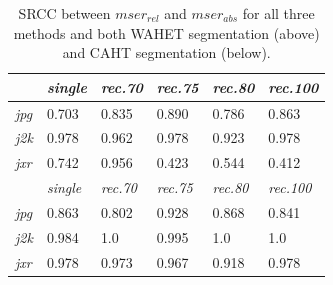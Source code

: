 \documentclass[10pt,twocolumn,letterpaper]{article}
\begin{document}
\begin{table}\footnotesize\centering
\begin{tabular}{ | l || l | l | l | l | l | }
    \hline
    & \emph{single} & \emph{rec.70} & \emph{rec.75} & \emph{rec.80} & \emph{rec.100} \\ \hline
    \emph{jpg} & 0.703 \cellcolor[rgb]{0,0.8,0} & 0.835 \cellcolor[rgb]{0,0.5,0} & 0.890 \cellcolor[rgb]{0,0.5,0} & 0.786 \cellcolor[rgb]{0,0.8,0} & 0.863 \cellcolor[rgb]{0,0.5,0} \\ \hline
    \emph{j2k} & 0.978 \cellcolor[rgb]{0,0.5,0} & 0.962 \cellcolor[rgb]{0,0.5,0} & 0.978 \cellcolor[rgb]{0,0.5,0} & 0.923 \cellcolor[rgb]{0,0.5,0} & 0.978 \cellcolor[rgb]{0,0.5,0} \\ \hline
    \emph{jxr} & 0.742 \cellcolor[rgb]{0,0.8,0} & 0.956 \cellcolor[rgb]{0,0.5,0} & 0.423 \cellcolor{orange} & 0.544 \cellcolor[rgb]{0,0.8,0} & 0.412 \cellcolor{orange} \\ \hline
    
    \hline
    & \emph{single} & \emph{rec.70} & \emph{rec.75} & \emph{rec.80} & \emph{rec.100} \\ \hline
    \emph{jpg} & \cellcolor[rgb]{0,0.5,0} 0.863 & \cellcolor[rgb]{0,0.5,0} 0.802 & \cellcolor[rgb]{0,0.5,0} 0.928 & \cellcolor[rgb]{0,0.5,0} 0.868 & \cellcolor[rgb]{0,0.5,0} 0.841 \\ \hline
    \emph{j2k} & \cellcolor[rgb]{0,0.5,0} 0.984 & \cellcolor[rgb]{0,0.5,0} 1.0 & \cellcolor[rgb]{0,0.5,0} 0.995 & \cellcolor[rgb]{0,0.5,0} 1.0 & \cellcolor[rgb]{0,0.5,0} 1.0 \\ \hline
    \emph{jxr} & \cellcolor[rgb]{0,0.5,0} 0.978 & \cellcolor[rgb]{0,0.5,0} 0.973 & \cellcolor[rgb]{0,0.5,0} 0.967 & \cellcolor[rgb]{0,0.5,0} 0.918 & \cellcolor[rgb]{0,0.5,0} 0.978 \\ \hline

\end{tabular}
\caption{SRCC between $mser_{rel}$ and $mser_{abs}$ for all three methods and both WAHET segmentation (above) and CAHT segmentation (below).}
\label{tab:corrMSER}
\end{table}
\end{document}
